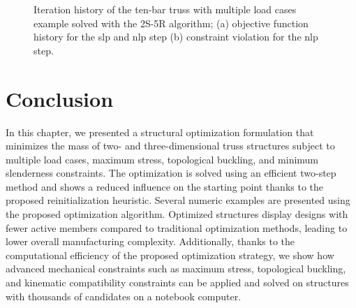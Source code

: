 \begin{figure}
    \hspace*{\fill}
    \hfill
    \hspace*{\fill}
    \caption{Iteration history of the ten-bar truss with multiple load cases example solved with the 2S-5R algorithm; (a) objective function history for the \gls{slp} and \gls{nlp} step (b) constraint violation for the \gls{nlp} step.}
    \label{fig:04_c1}
\end{figure}

\section{Conclusion}
In this chapter, we presented a structural optimization formulation that minimizes the mass of two- and three-dimensional truss structures subject to multiple load cases, maximum stress, topological buckling, and minimum slenderness constraints. The optimization is solved using an efficient two-step method and shows a reduced influence on the starting point thanks to the proposed reinitialization heuristic. Several numeric examples are presented using the proposed optimization algorithm. Optimized structures display designs with fewer active members compared to traditional optimization methods, leading to lower overall manufacturing complexity. Additionally, thanks to the computational efficiency of the proposed optimization strategy, we show how advanced mechanical constraints such as maximum stress, topological buckling, and kinematic compatibility constraints can be applied and solved on structures with thousands of candidates on a notebook computer.

